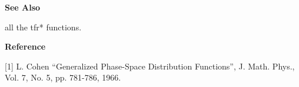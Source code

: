 {\bf \large {}\selectfont See Also}\\
\hspace*{1.5cm}
\begin{minipage}[t]{13.5cm}
all the {\ty tfr*} functions.
\end{minipage}
\vspace*{.5cm}


{\bf \large {}\selectfont Reference}\\
\hspace*{1.5cm}
\begin{minipage}[t]{13.5cm}
[1] L. Cohen ``Generalized Phase-Space Distribution Functions'',
J. Math. Phys., Vol. 7, No. 5, pp. 781-786, 1966.
\end{minipage}
